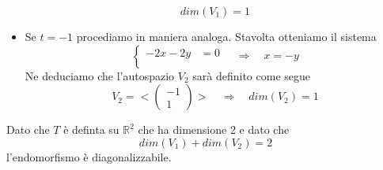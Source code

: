 \begin{example}
\begin{itemize}
\[			      dim(V_1) = 1
		      \]
		\item Se $t = -1$ procediamo in maniera analoga. Stavolta otteniamo il sistema
		      \[
			      \begin{cases}
				      -2x - 2y & = 0 \\
			      \end{cases} \quad \Rightarrow \quad
			      x = -y
		      \]
		      Ne deduciamo che l'autospazio $V_2$ sar\`a definito come segue
		      \[
			      V_2 = < \begin{pmatrix} -1 \\ 1 \end{pmatrix} > \quad \Rightarrow \quad
			      dim(V_2) = 1
		      \]
	\end{itemize}
	Dato che $T$ \`e definta su $\mathbb{R}^2$ che ha dimensione 2 e dato che
	\[ dim(V_1) + dim(V_2) = 2 \] l'endomorfismo \`e diagonalizzabile.
\end{example}